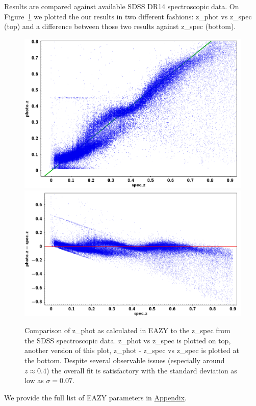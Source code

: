 Results are compared against available SDSS DR14 spectroscopic data. On Figure~\ref{fig:photo_z} we plotted the our results in two different fashions: z\_phot vs z\_spec (top) and a difference between those two results against z\_spec (bottom).

\begin{figure}[!ht]
\includegraphics[width=5.7in]{Figures/photo_z_vs_spec_z.png}
\includegraphics[width=5.7in]{Figures/photo_z_-_spec_z.png}
\caption{Comparison of z\_phot as calculated in EAZY to the z\_spec from the SDSS spectroscopic data. z\_phot vs z\_spec is plotted on top, another version of this plot, z\_phot - z\_spec vs z\_spec is plotted at the bottom. Despite several observable issues (especially around $z\approx 0.4$) the overall fit is satisfactory with the standard deviation as low as $\sigma=0.07$.}
\label{fig:photo_z}
\end{figure}

We provide the full list of EAZY parameters in \hyperref[sec:eazy]{Appendix}.

